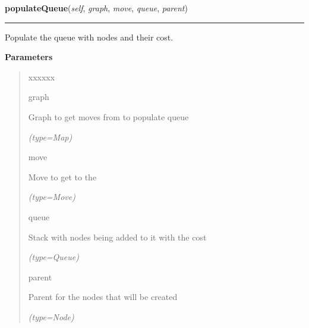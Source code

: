 \hspace{.8\funcindent}\begin{boxedminipage}{\funcwidth}

    \raggedright \textbf{populateQueue}(\textit{self}, \textit{graph}, \textit{move}, \textit{queue}, \textit{parent})

    \vspace{-1.5ex}

    \rule{\textwidth}{0.5\fboxrule}
\setlength{\parskip}{2ex}
    Populate the queue with nodes and their cost.

\setlength{\parskip}{1ex}
      \textbf{Parameters}
      \vspace{-1ex}

      \begin{quote}
        \begin{Ventry}{xxxxxx}

          \item[graph]

          Graph to get moves from to populate queue

            {\it (type=Map)}

          \item[move]

          Move to get to the

            {\it (type=Move)}

          \item[queue]

          Stack with nodes being added to it with the cost

            {\it (type=Queue)}

          \item[parent]

          Parent for the nodes that will be created

            {\it (type=Node)}

        \end{Ventry}

      \end{quote}

    \end{boxedminipage}

    \vspace{0.5ex}

